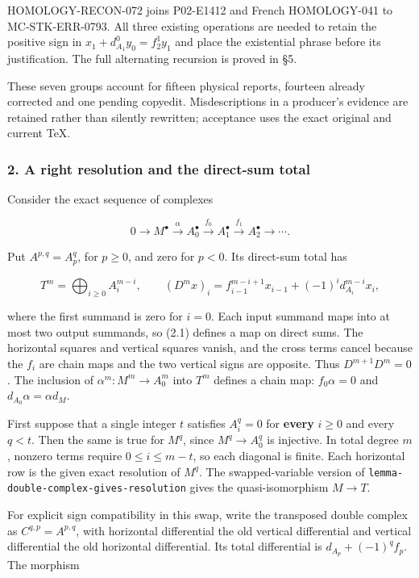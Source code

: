 \documentclass[11pt]{article}
\begin{document}
HOMOLOGY-RECON-072 joins P02-E1412 and French HOMOLOGY-041 to MC-STK-ERR-0793. All three existing operations are needed to retain the positive sign in \(x_1+d_{A_1}^0y_0=f_2^1y_1\) and place the existential phrase before its justification. The full alternating recursion is proved in §5.

These seven groups account for fifteen physical reports, fourteen already corrected and one pending copyedit. Misdescriptions in a producer's evidence are retained rather than silently rewritten; acceptance uses the exact original and current TeX.

\subsubsection{2. A right resolution and the direct-sum total}\label{a-right-resolution-and-the-direct-sum-total}

Consider the exact sequence of complexes

\[
0\longrightarrow M^\bullet\xrightarrow{\alpha}A_0^\bullet
\xrightarrow{f_0}A_1^\bullet\xrightarrow{f_1}A_2^\bullet
\longrightarrow\cdots.
\]

Put \(A^{p,q}=A_p^q\), for \(p\geq0\), and zero for \(p<0\). Its direct-sum total has

\[
T^m=\bigoplus_{i\geq0}A_i^{m-i},\qquad
(D^mx)_i=f_{i-1}^{m-i+1}x_{i-1}+(-1)^i d_{A_i}^{m-i}x_i,       \tag{2.1}
\]

where the first summand is zero for \(i=0\). Each input summand maps into at most two output summands, so (2.1) defines a map on direct sums. The horizontal squares and vertical squares vanish, and the cross terms cancel because the \(f_i\) are chain maps and the two vertical signs are opposite. Thus \(D^{m+1}D^m=0\). The inclusion of \(\alpha^m:M^m\to A_0^m\) into \(T^m\) defines a chain map: \(f_0\alpha=0\) and \(d_{A_0}\alpha=\alpha d_M\).

First suppose that a single integer \(t\) satisfies \(A_i^q=0\) for \textbf{every} \(i\geq0\) and every \(q<t\). Then the same is true for \(M^q\), since \(M^q\to A_0^q\) is injective. In total degree \(m\), nonzero terms require \(0\leq i\leq m-t\), so each diagonal is finite. Each horizontal row is the given exact resolution of \(M^q\). The swapped-variable version of \texttt{lemma-double-complex-gives-resolution} gives the quasi-isomorphism \(M\to T\).

For explicit sign compatibility in this swap, write the transposed double complex as \(C^{q,p}=A^{p,q}\), with horizontal differential the old vertical differential and vertical differential the old horizontal differential. Its total differential is \(d_{A_p}+(-1)^q f_p\). The morphism
\end{document}
